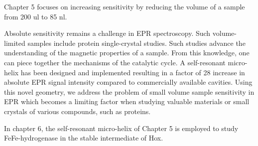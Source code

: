 Chapter 5 focuses on increasing sensitivity by reducing the volume of a sample from 200 ul to 85 nl.

Absolute sensitivity remains a challenge in EPR spectroscopy. Such volume-limited samples include protein single-crystal studies. Such studies advance the understanding of the magnetic properties of a sample. From this knowledge, one can piece together the mechanisms of the catalytic cycle. A self-resonant micro-helix has been designed and implemented resulting in a factor of 28 increase in absolute EPR signal intensity compared to commercially available cavities. Using this novel geometry, we address the problem of small volume sample sensitivity in EPR which becomes a limiting factor when studying valuable materials or small crystals of various compounds, such as proteins. 

In chapter 6, the self-resonant micro-helix of Chapter 5 is employed to study FeFe-hydrogenase in the stable intermediate of Hox. 







{\renewcommand{\bibsection}{\clearpage\section*{\bibname}\markboth{\bibname}{\bibname}}
\renewcommand{\bibname}{CHAPTER 1. REFERENCES}


}